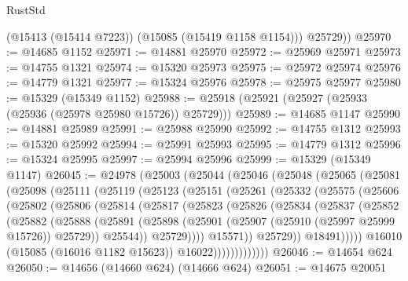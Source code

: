 \begin{lexlean}{RustStd}
\begin{coremodule}
          (@15413 (@15414 @7223))
          (@15085 (@15419 @1158 @1154)))
        @25729))
@25970 := @14685 @1152
@25971 := @14881 @25970
@25972 := @25969 @25971
@25973 := @14755 @1321
@25974 := @15320 @25973
@25975 := @25972 @25974
@25976 := @14779 @1321
@25977 := @15324 @25976
@25978 := @25975 @25977
@25980 := @15329 (@15349 @1152)
@25988 := @25918 (@25921 (@25927 (@25933 (@25936 (@25978 @25980 @15726)) @25729)))
@25989 := @14685 @1147
@25990 := @14881 @25989
@25991 := @25988 @25990
@25992 := @14755 @1312
@25993 := @15320 @25992
@25994 := @25991 @25993
@25995 := @14779 @1312
@25996 := @15324 @25995
@25997 := @25994 @25996
@25999 := @15329 (@15349 @1147)
@26045 := @24978
    (@25003
      (@25044
        (@25046
          (@25048
            (@25065
              (@25081
                (@25098
                  (@25111
                    (@25119
                      (@25123
                        (@25151
                          (@25261
                            (@25332
                              (@25575
                                (@25606
                                  (@25802
                                    (@25806
                                      (@25814
                                        (@25817
                                          (@25823
                                            (@25826
                                              (@25834
                                                (@25837
                                                  (@25852
                                                    (@25882
                                                      (@25888
                                                        (@25891
                                                          (@25898
                                                            (@25901
                                                              (@25907
                                                                (@25910 (@25997 @25999 @15726))
                                                                @25729))
                                                            @25544))
                                                        @25729))))
                                                @15571))
                                            @25729))
                                        @18491)))))
                              @16010
                              (@15085 (@16016 @1182 @15623))
                              @16022)))))))))))))
@26046 := @14654 @624
@26050 := @14656 (@14660 @624) (@14666 @624)
@26051 := @14675 @20051

\end{coremodule}
\end{lexlean}
